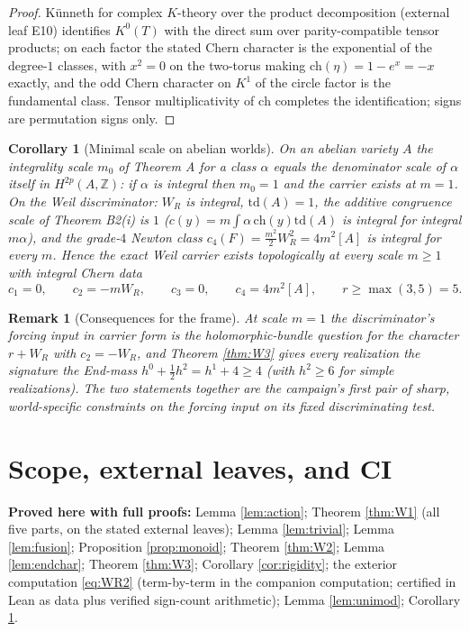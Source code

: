 \documentclass[11pt]{article}
\newtheorem{corollary}{Corollary}
\newtheorem{remark}{Remark}
\begin{document}
\begin{proof}
K\"unneth for complex $K$-theory over the product decomposition (external leaf E10) identifies $K^0(T)$ with the
direct sum over parity-compatible tensor products; on each factor the stated Chern character is the exponential of
the degree-$1$ classes, with $x^2=0$ on the two-torus making $\mathrm{ch}(\eta)=1-e^{x}=-x$ exactly, and the odd
Chern character on $K^1$ of the circle factor is the fundamental class. Tensor multiplicativity of $\mathrm{ch}$
completes the identification; signs are permutation signs only.
\end{proof}

\begin{corollary}[Minimal scale on abelian worlds]\label{cor:scale}
On an abelian variety $A$ the integrality scale $m_0$ of Theorem A for a class $\alpha$ equals the denominator
scale of $\alpha$ itself in $H^{2p}(A,\mathbb{Z})$: if $\alpha$ is integral then $m_0=1$ and the carrier exists at
$m=1$. On the Weil discriminator: $W_R$ is integral, $\mathrm{td}(A)=1$, the additive congruence scale of
Theorem B2(i) is $1$ ($c(y)=m\int\alpha\,\mathrm{ch}(y)\mathrm{td}(A)$ is integral for integral $m\alpha$), and the
grade-$4$ Newton class $c_4(F)=\tfrac{m^2}{2}W_R^2=4m^2[A]$ is integral for every $m$. Hence the exact Weil carrier
exists topologically at every scale $m\ge1$ with integral Chern data
\[
c_1=0,\qquad c_2=-mW_R,\qquad c_3=0,\qquad c_4=4m^2[A],\qquad r\ge\max(3,5)=5.
\]
\end{corollary}

\begin{remark}[Consequences for the frame]
At scale $m=1$ the discriminator's forcing input in carrier form is the holomorphic-bundle question for the
character $r+W_R$ with $c_2=-W_R$, and Theorem \ref{thm:W3} gives every realization the signature
the End-mass $h^0+\tfrac12h^2=h^1+4\ge4$ (with $h^2\ge6$ for simple realizations). The two statements together are the campaign's first pair of sharp, world-specific
constraints on the forcing input on its fixed discriminating test.
\end{remark}

\section{Scope, external leaves, and CI}\label{sec:scope}

\textbf{Proved here with full proofs:} Lemma \ref{lem:action}; Theorem \ref{thm:W1} (all five parts, on the stated
external leaves); Lemma \ref{lem:trivial}; Lemma \ref{lem:fusion}; Proposition \ref{prop:monoid}; Theorem
\ref{thm:W2}; Lemma \ref{lem:endchar}; Theorem \ref{thm:W3}; Corollary \ref{cor:rigidity}; the exterior computation
\eqref{eq:WR2} (term-by-term in the companion computation; certified in Lean as data plus verified sign-count
arithmetic); Lemma \ref{lem:unimod}; Corollary \ref{cor:scale}.
\end{document}

